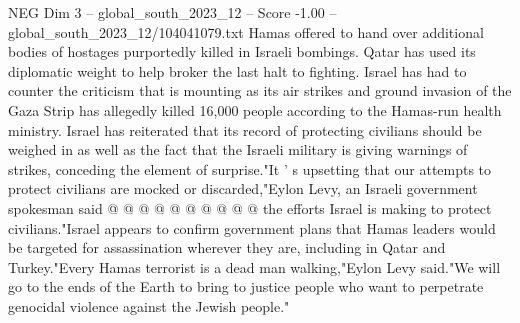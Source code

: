 \begin{textsample}{NEG Dim 3 – global\_south\_2023\_12 – Score -1.00 – global\_south\_2023\_12/104041079.txt}
Hamas offered to hand over additional bodies of hostages purportedly killed in Israeli bombings.
Qatar has used its diplomatic weight to help broker the last halt to fighting.
Israel has had to counter the criticism that is mounting as its air strikes and ground invasion of the Gaza Strip has allegedly killed 16,000 people according to the Hamas-run health ministry.
Israel has reiterated that its record of protecting civilians should be weighed in as well as the fact that the Israeli military is giving warnings of strikes, conceding the element of surprise."It ' s upsetting that our attempts to protect civilians are mocked or discarded,"Eylon Levy, an Israeli government spokesman said @ @ @ @ @ @ @ @ @ @ the efforts Israel is making to protect civilians."Israel appears to confirm government plans that Hamas leaders would be targeted for assassination wherever they are, including in Qatar and Turkey."Every Hamas terrorist is a dead man walking,"Eylon Levy said."We will go to the ends of the Earth to bring to justice people who want to perpetrate genocidal violence against the Jewish people."

\end{textsample}
